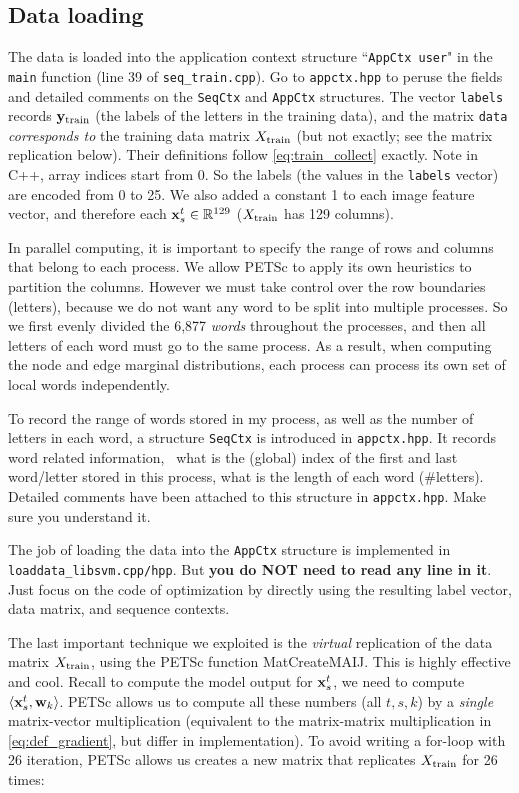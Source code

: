 \documentclass[11pt]{report}
\begin{document}
\subsection{Data loading}
\label{sec:data_loading}

The data is loaded into the application context structure ``\verb!AppCtx user!" in the \verb!main! function (line 39 of \verb!seq_train.cpp!).
Go to \verb!appctx.hpp! to peruse the fields and detailed comments on the \verb!SeqCtx! and \verb!AppCtx! structures.
The vector \verb!labels! records ${\mathbf{\boldsymbol{y}}_{\text{train}}}$ (the labels of the letters in the training data),
and the matrix \verb!data! \emph{corresponds to} the training data matrix $X_{\text{train}}$
(but not exactly; see the matrix replication below).
Their definitions follow \eqref{eq:train_collect} exactly.
Note in C++, array indices start from 0.
So the labels (the values in the \verb!labels! vector) are encoded from 0 to 25.
We also added a constant 1 to each image feature vector,
and therefore each $\mathbf{\boldsymbol{x}}^t_s \in \mathbb{R}^{129}$ ($X_{\text{train}}$ has 129 columns).

In parallel computing, it is important to specify the range of rows and columns that belong to each process.
We allow PETSc to apply its own heuristics to partition the columns.
However we must take control over the row boundaries (letters),
because we do not want any word to be split into multiple processes.
So we first evenly divided the 6,877 \emph{words} throughout the processes,
and then all letters of each word must go to the same process.
As a result, when computing the node and edge marginal distributions,
each process can process its own set of local words independently.

To record the range of words stored in my process, as well as the number of letters in each word,
a structure \verb!SeqCtx! is introduced in \verb!appctx.hpp!.
It records word related information, \eg\ what is the (global) index of the first and last word/letter stored in this process, what is the length of each word (\#letters).
Detailed comments have been attached to this structure in \verb!appctx.hpp!.
Make sure you understand it.


The job of loading the data into the \verb!AppCtx! structure is implemented in
\verb!loaddata_libsvm.cpp/hpp!.
But {\bf you do NOT need to read any line in it}.
Just focus on the code of optimization by directly using the resulting label vector,
data matrix, and sequence contexts.

The last important technique we exploited is the \emph{virtual} replication of the data matrix $X_{\text{train}}$,
using the PETSc function MatCreateMAIJ.
This is highly effective and cool.
Recall to compute the model output for $\mathbf{\boldsymbol{x}}^t_s$, we need to compute $\left\langle \mathbf{\boldsymbol{x}}^t_s,\mathbf{\boldsymbol{w}}_k \right\rangle$.
PETSc allows us to compute all these numbers (all $t, s, k$) by a \emph{single} matrix-vector multiplication
(equivalent to the matrix-matrix multiplication in \eqref{eq:def_gradient}, but differ in implementation).
To avoid writing a for-loop with 26 iteration,
PETSc allows us creates a new matrix that replicates $X_{\text{train}}$ for 26 times:
\end{document}
